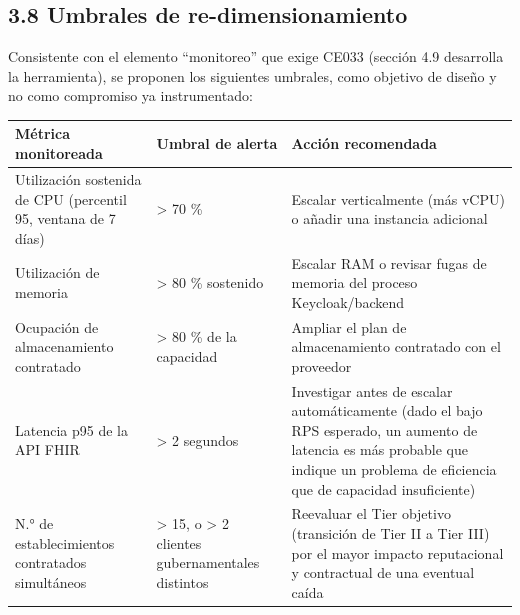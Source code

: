 \documentclass[11pt,a4paper]{article}
\begin{document}
\subsection{3.8 Umbrales de re-dimensionamiento}\label{umbrales-de-re-dimensionamiento}

Consistente con el elemento ``monitoreo'' que exige CE033 (sección 4.9 desarrolla la herramienta), se proponen los siguientes umbrales, como objetivo de diseño y no como compromiso ya instrumentado:

{\small
\begin{longtable}[]{@{}
  >{\raggedright\arraybackslash}p{}
  >{\raggedright\arraybackslash}p{}
  >{\raggedright\arraybackslash}p{}@{}}
\toprule\noalign{}
\begin{minipage}[b]{\linewidth}\raggedright
Métrica monitoreada
\end{minipage} & \begin{minipage}[b]{\linewidth}\raggedright
Umbral de alerta
\end{minipage} & \begin{minipage}[b]{\linewidth}\raggedright
Acción recomendada
\end{minipage} \\
\midrule\noalign{}
\endhead
\bottomrule\noalign{}
\endlastfoot
Utilización sostenida de CPU (percentil 95, ventana de 7 días) & \textgreater{} 70 \% & Escalar verticalmente (más vCPU) o añadir una instancia adicional \\
Utilización de memoria & \textgreater{} 80 \% sostenido & Escalar RAM o revisar fugas de memoria del proceso Keycloak/backend \\
Ocupación de almacenamiento contratado & \textgreater{} 80 \% de la capacidad & Ampliar el plan de almacenamiento contratado con el proveedor \\
Latencia p95 de la API FHIR & \textgreater{} 2 segundos & Investigar antes de escalar automáticamente (dado el bajo RPS esperado, un aumento de latencia es más probable que indique un problema de eficiencia que de capacidad insuficiente) \\
N.° de establecimientos contratados simultáneos & \textgreater{} 15, o \textgreater{} 2 clientes gubernamentales distintos & Reevaluar el Tier objetivo (transición de Tier II a Tier III) por el mayor impacto reputacional y contractual de una eventual caída \\
\end{longtable}
}
\end{document}
